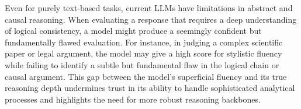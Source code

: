 \documentclass[acmsmall,screen]{acmart}
\begin{document}
Even for purely text-based tasks, current LLMs have limitations in abstract and causal reasoning. When evaluating a response that requires a deep understanding of logical consistency, a model might produce a seemingly confident but fundamentally flawed evaluation. For instance, in judging a complex scientific paper or legal argument, the model may give a high score for stylistic fluency while failing to identify a subtle but fundamental flaw in the logical chain or causal argument. This gap between the model's superficial fluency and its true reasoning depth undermines trust in its ability to handle sophisticated analytical processes and highlights the need for more robust reasoning backbones.



\end{document}
